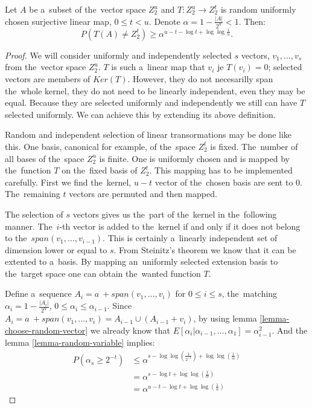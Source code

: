 \begin{theorem}
\label{theorem-linear-function-set-onto}
Let $A$ be a~subset of the~vector space $Z_2^u$ and $T: Z_2^u \rightarrow Z_2^t$ is random uniformly chosen surjective linear map, $0 \leq t < u$. Denote $\alpha = 1 - \frac{|A|}{2^u} < 1$. Then:
\begin{displaymath}
P(T(A) \neq Z_2^t) \geq \alpha^{u - t - \log t + \log \log \frac{1}{\alpha}} \textit{.}
\end{displaymath}
\end{theorem}
\begin{proof}
We will consider uniformly and independently selected $s$ vectors, $v_1, \dots, v_s$ from the~vector space $Z_2^u$. $T$ is such a~linear map that $v_i$ je $T(v_i) = 0$; selected vectors are members of $Ker(T)$. However, they do not necesarilly span the~whole kernel, they do not need to be linearly independent, even they may be equal. Because they are selected uniformly and independently we still can have $T$ selected uniformly. We can achieve this by extending its above definition. 

Random and independent selection of linear transormations may be done like this. One basis, canonical for example, of the~space $Z_2^t$ is fixed. The~number of all bases of the~space $Z_2^u$ is finite. One is uniformly chosen and is mapped by the~function $T$ on the~fixed basis of $Z_2^t$. This mapping has to be implemented carefully. First we find the~kernel, $u-t$ vector of the~chosen basis are sent to $0$. The~remaining $t$ vectors are permuted and then mapped.

The selection of $s$ vectors gives us the~part of the~kernel in the~following manner. The~$i$-th vector is added to the~kernel if and only if it does not belong to the~$span(v_1, \dots, v_{i-1})$. This is certainly a~linearly independent set of dimension lower or equal to $s$. From Steinitz's theorem we know that it can be extented to a~basis. By mapping an~uniformly selected extension basis to the~target space one can obtain the~wanted function $T$.

Define a~sequence $A_i = a~+ span(v_1, \dots, v_i)$ for $0 \leq i \leq s$, the~matching $\alpha_i = 1 - \frac{|A_i|}{2^u}$, $0 \leq \alpha_i \leq \alpha_{i-1}$. Since $A_{i} = a~+ span(v_1, \dots, v_i) = A_{i-1} \cup (A_{i-1} + v_i)$, by using lemma \ref{lemma-choose-random-vector} we already know that $E[\alpha_i | \alpha_{i-1}, \dots, \alpha_1] = \alpha_{i-1}^2$. And the lemma \ref{lemma-random-variable} implies:
\begin{displaymath}
\begin{split}
P(\alpha_s \geq 2^{-t}) 
	& \leq \alpha^{s - \log \log (\frac{1}{2^{-t}}) + \log \log (\frac{1}{\alpha})} \\
	& = \alpha^{s - \log t + \log \log (\frac{1}{\alpha})} \\
	& = \alpha^{u - t - \log t + \log \log (\frac{1}{\alpha})}
\end{split}
\end{displaymath}


\end{proof}
